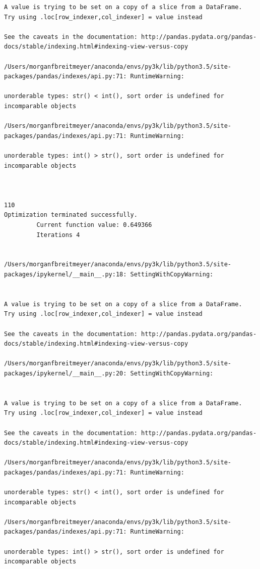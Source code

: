 \begin{lstlisting}
A value is trying to be set on a copy of a slice from a DataFrame.
Try using .loc[row_indexer,col_indexer] = value instead

See the caveats in the documentation: http://pandas.pydata.org/pandas-docs/stable/indexing.html#indexing-view-versus-copy

/Users/morganfbreitmeyer/anaconda/envs/py3k/lib/python3.5/site-packages/pandas/indexes/api.py:71: RuntimeWarning:

unorderable types: str() < int(), sort order is undefined for incomparable objects

/Users/morganfbreitmeyer/anaconda/envs/py3k/lib/python3.5/site-packages/pandas/indexes/api.py:71: RuntimeWarning:

unorderable types: int() > str(), sort order is undefined for incomparable objects



110
Optimization terminated successfully.
         Current function value: 0.649366
         Iterations 4


/Users/morganfbreitmeyer/anaconda/envs/py3k/lib/python3.5/site-packages/ipykernel/__main__.py:18: SettingWithCopyWarning:


A value is trying to be set on a copy of a slice from a DataFrame.
Try using .loc[row_indexer,col_indexer] = value instead

See the caveats in the documentation: http://pandas.pydata.org/pandas-docs/stable/indexing.html#indexing-view-versus-copy

/Users/morganfbreitmeyer/anaconda/envs/py3k/lib/python3.5/site-packages/ipykernel/__main__.py:20: SettingWithCopyWarning:


A value is trying to be set on a copy of a slice from a DataFrame.
Try using .loc[row_indexer,col_indexer] = value instead

See the caveats in the documentation: http://pandas.pydata.org/pandas-docs/stable/indexing.html#indexing-view-versus-copy

/Users/morganfbreitmeyer/anaconda/envs/py3k/lib/python3.5/site-packages/pandas/indexes/api.py:71: RuntimeWarning:

unorderable types: str() < int(), sort order is undefined for incomparable objects

/Users/morganfbreitmeyer/anaconda/envs/py3k/lib/python3.5/site-packages/pandas/indexes/api.py:71: RuntimeWarning:

unorderable types: int() > str(), sort order is undefined for incomparable objects




\end{lstlisting}
